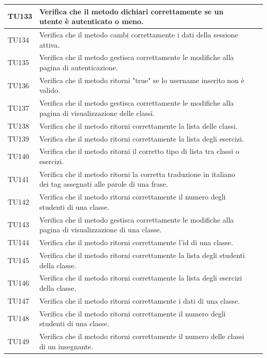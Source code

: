 \begin{longtable}{|>{\centering\arraybackslash}m{1.6cm}|>{\centering\arraybackslash}m{6.41cm}|>{\centering\arraybackslash}m{3.1cm}| c |}
		\rowcolor{LightGray}
		TU133 & Verifica che il metodo dichiari correttamente se un utente è autenticato o meno.  \\ \hline
		TU134 & Verifica che il metodo cambi correttamente i dati della sessione attiva.  \\ \hline
		\rowcolor{LightGray}
		TU135 & Verifica che il metodo gestisca correttamente le modifiche alla pagina di autenticazione. \\ \hline
		TU136 & Verifica che il metodo ritorni "true" se lo username inserito non è valido. \\ \hline
		\rowcolor{LightGray}
		TU137 & Verifica che il metodo gestisca correttamente le modifiche alla pagina di visualizzazione delle classi. \\ \hline
		TU138 & Verifica che il metodo ritorni correttamente la lista delle classi. \\ \hline
		\rowcolor{LightGray}
		TU139 & Verifica che il metodo ritorni correttamente la lista degli esercizi. \\ \hline
		TU140 & Verifica che il metodo ritorni il corretto tipo di lista tra classi o esercizi.\\ \hline
		\rowcolor{LightGray}
		TU141 & Verifica che il metodo ritorni la corretta traduzione in italiano dei tag assegnati alle parole di una frase. \\ \hline
		TU142 & Verifica che il metodo ritorni correttamente il numero degli studenti di una classe. \\ \hline
		\rowcolor{LightGray}
		TU143 & Verifica che il metodo gestisca correttamente le modifiche alla pagina di visualizzazione di una classe. \\ \hline
		TU144 & Verifica che il metodo ritorni correttamente l'id di una classe. \\ \hline
		\rowcolor{LightGray}
		TU145 & Verifica che il metodo ritorni correttamente la lista degli studenti della classe.\\ \hline
		TU146 & Verifica che il metodo ritorni correttamente la lista degli esercizi della classe. \\ \hline
		\rowcolor{LightGray}
		TU147 & Verifica che il metodo ritorni correttamente i dati di una classe.\\ \hline
		TU148 & Verifica che il metodo ritorni correttamente il numero degli studenti di una classe. \\ \hline
		\rowcolor{LightGray}
		TU149 & Verifica che il metodo ritorni correttamente il numero delle classi di un insegnante.\\ \hline

\end{longtable}
